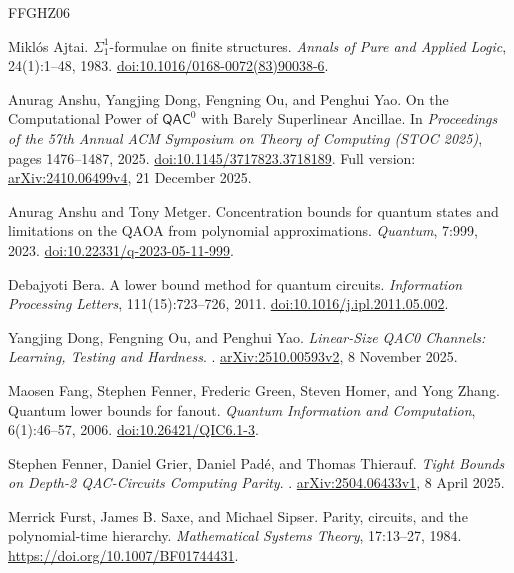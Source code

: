 \begin{thebibliography}{FFGHZ06}

Mikl\'os Ajtai.
\newblock $\Sigma^1_1$-formulae on finite structures.
\newblock \emph{Annals of Pure and Applied Logic}, 24(1):1--48, 1983.
\newblock \href{https://doi.org/10.1016/0168-0072(83)90038-6}{doi:10.1016/0168-0072(83)90038-6}.

Anurag Anshu, Yangjing Dong, Fengning Ou, and Penghui Yao.
\newblock On the Computational Power of $\mathsf{QAC}^{0}$ with Barely
Superlinear Ancillae.
\newblock In \emph{Proceedings of the 57th Annual ACM Symposium on Theory of
Computing (STOC 2025)}, pages 1476--1487, 2025.
\newblock \href{https://doi.org/10.1145/3717823.3718189}{doi:10.1145/3717823.3718189}.
Full version: \href{https://arxiv.org/abs/2410.06499v4}{arXiv:2410.06499v4},
21 December 2025.

Anurag Anshu and Tony Metger.
\newblock Concentration bounds for quantum states and limitations on the
QAOA from polynomial approximations.
\newblock \emph{Quantum}, 7:999, 2023.
\newblock \href{https://doi.org/10.22331/q-2023-05-11-999}{doi:10.22331/q-2023-05-11-999}.

Debajyoti Bera.
\newblock A lower bound method for quantum circuits.
\newblock \emph{Information Processing Letters}, 111(15):723--726, 2011.
\newblock \href{https://doi.org/10.1016/j.ipl.2011.05.002}{doi:10.1016/j.ipl.2011.05.002}.

Yangjing Dong, Fengning Ou, and Penghui Yao.
\newblock \emph{Linear-Size QAC0 Channels: Learning, Testing and Hardness}.
. \href{https://arxiv.org/abs/2510.00593v2}{arXiv:2510.00593v2},
8 November 2025.

Maosen Fang, Stephen Fenner, Frederic Green, Steven Homer, and Yong Zhang.
\newblock Quantum lower bounds for fanout.
\newblock \emph{Quantum Information and Computation}, 6(1):46--57, 2006.
\newblock \href{https://doi.org/10.26421/QIC6.1-3}{doi:10.26421/QIC6.1-3}.

Stephen Fenner, Daniel Grier, Daniel Pad\'e, and Thomas Thierauf.
\newblock \emph{Tight Bounds on Depth-2 QAC-Circuits Computing Parity}.
. \href{https://arxiv.org/abs/2504.06433v1}{arXiv:2504.06433v1},
8 April 2025.

Merrick Furst, James B. Saxe, and Michael Sipser.
\newblock Parity, circuits, and the polynomial-time hierarchy.
\newblock \emph{Mathematical Systems Theory}, 17:13--27, 1984.
\newblock \url{https://doi.org/10.1007/BF01744431}.


\end{thebibliography}
